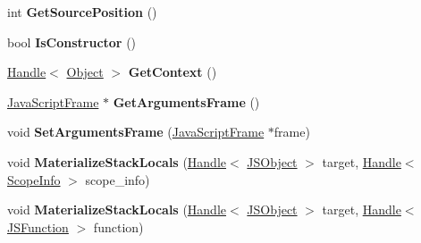 \begin{DoxyCompactItemize}
\item 
int {\bfseries Get\+Source\+Position} ()\hypertarget{classv8_1_1internal_1_1_frame_inspector_a31b51923ecbf8f24b7bb7090b6655271}{}\label{classv8_1_1internal_1_1_frame_inspector_a31b51923ecbf8f24b7bb7090b6655271}

\item 
bool {\bfseries Is\+Constructor} ()\hypertarget{classv8_1_1internal_1_1_frame_inspector_a7e4ed371c98867c2c81e7f567f216a7f}{}\label{classv8_1_1internal_1_1_frame_inspector_a7e4ed371c98867c2c81e7f567f216a7f}

\item 
\hyperlink{classv8_1_1internal_1_1_handle}{Handle}$<$ \hyperlink{classv8_1_1internal_1_1_object}{Object} $>$ {\bfseries Get\+Context} ()\hypertarget{classv8_1_1internal_1_1_frame_inspector_af1a0a03aed11e26d0f38775c535d3f47}{}\label{classv8_1_1internal_1_1_frame_inspector_af1a0a03aed11e26d0f38775c535d3f47}

\item 
\hyperlink{classv8_1_1internal_1_1_java_script_frame}{Java\+Script\+Frame} $\ast$ {\bfseries Get\+Arguments\+Frame} ()\hypertarget{classv8_1_1internal_1_1_frame_inspector_adba3141d604ecbec77f74cff32f05997}{}\label{classv8_1_1internal_1_1_frame_inspector_adba3141d604ecbec77f74cff32f05997}

\item 
void {\bfseries Set\+Arguments\+Frame} (\hyperlink{classv8_1_1internal_1_1_java_script_frame}{Java\+Script\+Frame} $\ast$frame)\hypertarget{classv8_1_1internal_1_1_frame_inspector_a154b259576f39ff2257386bb63231c9b}{}\label{classv8_1_1internal_1_1_frame_inspector_a154b259576f39ff2257386bb63231c9b}

\item 
void {\bfseries Materialize\+Stack\+Locals} (\hyperlink{classv8_1_1internal_1_1_handle}{Handle}$<$ \hyperlink{classv8_1_1internal_1_1_j_s_object}{J\+S\+Object} $>$ target, \hyperlink{classv8_1_1internal_1_1_handle}{Handle}$<$ \hyperlink{classv8_1_1internal_1_1_scope_info}{Scope\+Info} $>$ scope\+\_\+info)\hypertarget{classv8_1_1internal_1_1_frame_inspector_a0729159a86243f4566f467477ab4e4c7}{}\label{classv8_1_1internal_1_1_frame_inspector_a0729159a86243f4566f467477ab4e4c7}

\item 
void {\bfseries Materialize\+Stack\+Locals} (\hyperlink{classv8_1_1internal_1_1_handle}{Handle}$<$ \hyperlink{classv8_1_1internal_1_1_j_s_object}{J\+S\+Object} $>$ target, \hyperlink{classv8_1_1internal_1_1_handle}{Handle}$<$ \hyperlink{classv8_1_1internal_1_1_j_s_function}{J\+S\+Function} $>$ function)\hypertarget{classv8_1_1internal_1_1_frame_inspector_a091eb8dca8b539cfd6ceab9961f4fee2}{}\label{classv8_1_1internal_1_1_frame_inspector_a091eb8dca8b539cfd6ceab9961f4fee2}


\end{DoxyCompactItemize}
